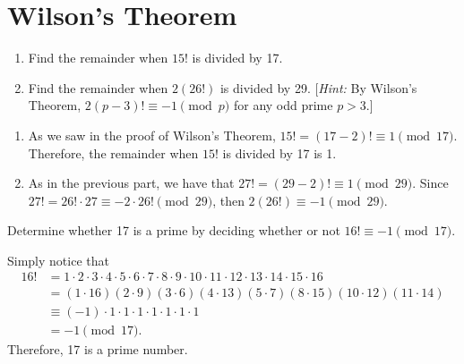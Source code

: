 \section{Wilson's Theorem}

\begin{exercise}
    \begin{enumerate}
        \item Find the remainder when $15!$ is divided by 17.
        \item Find the remainder when $2(26!)$ is divided by 29. [\textit{Hint:} By Wilson's Theorem, $2(p-3)! \equiv -1 \pmod{p}$ for any odd prime $p > 3$.]
    \end{enumerate}
\end{exercise}

\begin{solution}
    \begin{enumerate}
        \item As we saw in the proof of Wilson's Theorem, $15! = (17-2)! \equiv 1 \pmod{17}$. Therefore, the remainder when $15!$ is divided by 17 is 1.
        \item As in the previous part, we have that $27! = (29-2)! \equiv 1 \pmod{29}$. Since $27! = 26!\cdot 27 \equiv -2\cdot 26! \pmod{29}$, then $2(26!) \equiv -1 \pmod{29}$. \\
    \end{enumerate}
\end{solution}

\begin{exercise}
    Determine whether 17 is a prime by deciding whether or not $16! \equiv -1 \pmod{17}$.\\
\end{exercise}

\begin{solution}
    Simply notice that
    \begin{align*}
        16! &= 1\cdot 2 \cdot 3 \cdot 4 \cdot 5 \cdot 6 \cdot 7 \cdot 8 \cdot 9 \cdot 10 \cdot 11 \cdot 12 \cdot 13 \cdot 14 \cdot 15 \cdot 16 \\
        &= (1\cdot 16)(2\cdot 9)(3\cdot 6)(4\cdot 13)(5\cdot 7)(8\cdot 15)(10\cdot 12)(11 \cdot 14) \\
        &\equiv (-1) \cdot 1 \cdot 1\cdot 1\cdot 1\cdot 1\cdot 1\cdot 1 \\
        &= -1 \pmod{17}.
    \end{align*}
    Therefore, 17 is a prime number. \\
\end{solution}

